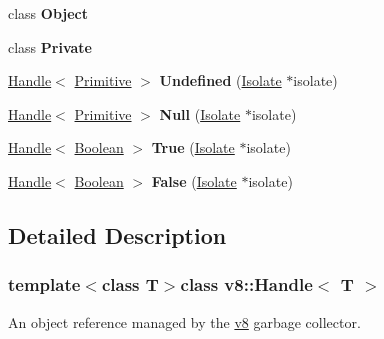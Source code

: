 \begin{DoxyCompactItemize}
\item 
\hypertarget{classv8_1_1Handle_a0720b5f434e636e22a3ed34f847eec57}{class {\bfseries Object}}\label{classv8_1_1Handle_a0720b5f434e636e22a3ed34f847eec57}

\item 
\hypertarget{classv8_1_1Handle_ac96b60d37bd806132da680e187dc2288}{class {\bfseries Private}}\label{classv8_1_1Handle_ac96b60d37bd806132da680e187dc2288}

\item 
\hypertarget{classv8_1_1Handle_a54e0b3d94c2292e9f7d4fc1618ecfdd6}{\hyperlink{classv8_1_1Handle}{Handle}$<$ \hyperlink{classv8_1_1Primitive}{Primitive} $>$ {\bfseries Undefined} (\hyperlink{classv8_1_1Isolate}{Isolate} $\ast$isolate)}\label{classv8_1_1Handle_a54e0b3d94c2292e9f7d4fc1618ecfdd6}

\item 
\hypertarget{classv8_1_1Handle_a495be557de6f0ea3848a2e8fc6505577}{\hyperlink{classv8_1_1Handle}{Handle}$<$ \hyperlink{classv8_1_1Primitive}{Primitive} $>$ {\bfseries Null} (\hyperlink{classv8_1_1Isolate}{Isolate} $\ast$isolate)}\label{classv8_1_1Handle_a495be557de6f0ea3848a2e8fc6505577}

\item 
\hypertarget{classv8_1_1Handle_a29e5558f47ee7c44b54dc3c20eaceb32}{\hyperlink{classv8_1_1Handle}{Handle}$<$ \hyperlink{classv8_1_1Boolean}{Boolean} $>$ {\bfseries True} (\hyperlink{classv8_1_1Isolate}{Isolate} $\ast$isolate)}\label{classv8_1_1Handle_a29e5558f47ee7c44b54dc3c20eaceb32}

\item 
\hypertarget{classv8_1_1Handle_af328581ad265dc321eb55a587708eedc}{\hyperlink{classv8_1_1Handle}{Handle}$<$ \hyperlink{classv8_1_1Boolean}{Boolean} $>$ {\bfseries False} (\hyperlink{classv8_1_1Isolate}{Isolate} $\ast$isolate)}\label{classv8_1_1Handle_af328581ad265dc321eb55a587708eedc}

\end{DoxyCompactItemize}


\subsection{Detailed Description}
\subsubsection*{template$<$class T$>$class v8\-::\-Handle$<$ T $>$}

An object reference managed by the \hyperlink{namespacev8}{v8} garbage collector.


